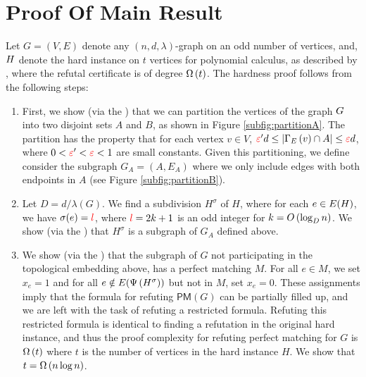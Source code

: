 \documentclass[11pt]{article}
\newcommand{\PerfectMatching}[1]{\mathsf{PM}\left(#1\right)}
\newcommand{\EnDeeLambda}{(n, d, \lambda)}
\newcommand{\Subdivision}[2]{{#1}^{#2}}
\newcommand{\ExpansionFactor}[1]{\lambda(#1)}
\begin{document}
\section{Proof Of Main Result}
\label{sec:main-proof}

Let $G=(V,E)$ denote any $\EnDeeLambda$-graph on an odd number of vertices, and,  $H$ denote the hard instance on $t$ vertices for polynomial calculus, as described by \citet{buss1999linear}, where the refutal certificate is of degree $\Omega\left(t\right)$.
The hardness proof follows from the following steps:


\begin{enumerate}
	\item First, we show (via the ) that we can partition the vertices of the graph $G$ into two disjoint sets $A$ and $B$, as shown in Figure \ref{subfig:partitionA}. The partition has the property that for each vertex $v \in V$, $\textcolor{red}{\varepsilon}'d \leq |\Gamma_{E}\left(v\right) \cap A| \leq \textcolor{red}{\varepsilon} d$, where $0 <\textcolor{red}{\varepsilon} '< \textcolor{red}{\varepsilon} < 1$ are small constants. Given this partitioning, we define consider the subgraph $G_A = (A, E_A)$ where we only include edges with both endpoints in $A$ (see Figure \ref{subfig:partitionB}).
	\item Let $D = d/\ExpansionFactor{G}$. We find a subdivision $\Subdivision{H}{\sigma}$ of $H$, where for each $e \in E(H)$, we have $\sigma(e) = \textcolor{red}{l}$, where $\textcolor{red}{l} = 2k+1$ is an odd integer for $k = O\left(\log_{D} n\right)$. We show (via the ) that $\Subdivision{H}{\sigma}$ is a subgraph of $G_A$ defined above. 
	
	\item We show (via the ) that the subgraph of $G$ not participating in the topological embedding above, has a perfect matching $M$. For all $e \in M$, we set $x_e = 1$ and for all $e \notin \Edges{\Embedding{\Subdivision{H}{\sigma}}}$ but not in $M$, set $x_e = 0$. These assignments imply that the formula for refuting $\PerfectMatching{G}$ can be partially filled up, and we are left with the task of refuting a restricted formula. Refuting this restricted formula is identical to finding a refutation in the original hard instance, and thus the proof complexity for refuting perfect matching for $G$ is $\Omega\left(t\right)$ where $t$ is the number of vertices in the hard instance $H$. We show that $t = \Omega\left(n\log n\right)$.
\end{enumerate}
\end{document}
